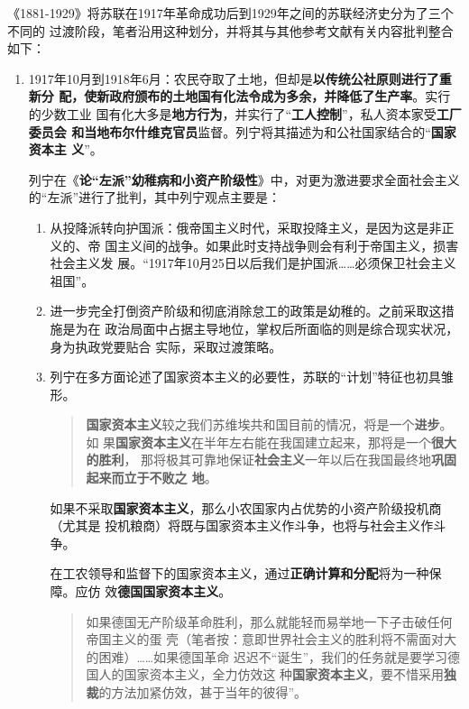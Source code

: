 《1881-1929》将苏联在1917年革命成功后到1929年之间的苏联经济史分为了三个不同的
过渡阶段，笔者沿用这种划分，并将其与其他参考文献有关内容批判整合如下：
\begin{enumerate}
\item 1917年10月到1918年6月：农民夺取了土地，但却是\textbf{以传统公社原则进行了重新分
    配，使新政府颁布的土地国有化法令成为多余，并降低了生产率}。实行的少数工业
  国有化大多是\textbf{地方行为}，并实行了“\textbf{工人控制}”，私人资本家受\textbf{工厂委员会
    和当地布尔什维克官员}监督。列宁将其描述为和公社国家结合的“\textbf{国家资本主
    义}”。

  列宁在《\textbf{论“左派”幼稚病和小资产阶级性}》中，对更为激进要求全面社会主义
  的“左派”进行了批判，其中列宁观点主要是：
  \begin{enumerate}
  \item 从投降派转向护国派：俄帝国主义时代，采取投降主义，是因为这是非正义的、帝
    国主义间的战争。如果此时支持战争则会有利于帝国主义，损害社会主义发
    展。“1917年10月25日以后我们是护国派……必须保卫社会主义祖国”。

  \item 进一步完全打倒资产阶级和彻底消除怠工的政策是幼稚的。之前采取这措施是为在
    政治局面中占据主导地位，掌权后所面临的则是综合现实状况，身为执政党要贴合
    实际，采取过渡策略。

  \item 列宁在多方面论述了国家资本主义的必要性，苏联的“计划”特征也初具雏形。
    \begin{quotation}
      \textbf{国家资本主义}较之我们苏维埃共和国目前的情况，将是一个\textbf{进步}。如
      果\textbf{国家资本主义}在半年左右能在我国建立起来，那将是一个\textbf{很大的胜利}，
      那将极其可靠地保证\textbf{社会主义}一年以后在我国最终地\textbf{巩固起来而立于不败之
        地}。
    \end{quotation}
    如果不采取\textbf{国家资本主义}，那么小农国家内占优势的小资产阶级投机商（尤其是
    投机粮商）将既与国家资本主义作斗争，也将与社会主义作斗争。

    在工农领导和监督下的国家资本主义，通过\textbf{正确计算和分配}将为一种保障。应仿
    效\textbf{德国国家资本主义}。
    \begin{quotation}
      如果德国无产阶级革命胜利，那么就能轻而易举地一下子击破任何帝国主义的蛋
      壳（笔者按：意即世界社会主义的胜利将不需面对大的困难）……如果德国革命
      迟迟不“诞生”，我们的任务就是要学习德国人的国家资本主义，全力仿效这
      种\textbf{国家资本主义}，要不惜采用\textbf{独裁}的方法加紧仿效，甚于当年的彼得”。
    \end{quotation}


\end{enumerate}
\end{enumerate}
